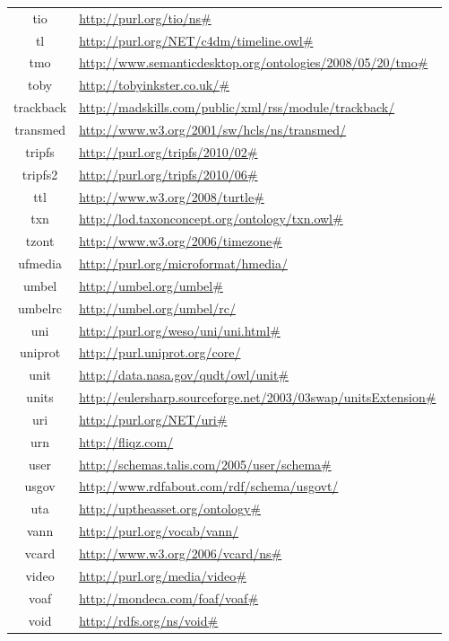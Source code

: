 \documentclass{article}
\begin{document}
\begin{longtable}{ c | p{8cm} }
		tio & \url{http://purl.org/tio/ns#} \\
		tl & \url{http://purl.org/NET/c4dm/timeline.owl#} \\
		tmo & \url{http://www.semanticdesktop.org/ontologies/2008/05/20/tmo#} \\
		toby & \url{http://tobyinkster.co.uk/#} \\
		trackback & \url{http://madskills.com/public/xml/rss/module/trackback/} \\
		transmed & \url{http://www.w3.org/2001/sw/hcls/ns/transmed/} \\
		tripfs & \url{http://purl.org/tripfs/2010/02#} \\
		tripfs2 & \url{http://purl.org/tripfs/2010/06#} \\
		ttl & \url{http://www.w3.org/2008/turtle#} \\
		txn & \url{http://lod.taxonconcept.org/ontology/txn.owl#} \\
		tzont & \url{http://www.w3.org/2006/timezone#} \\
		ufmedia & \url{http://purl.org/microformat/hmedia/} \\
		umbel & \url{http://umbel.org/umbel#} \\
		umbelrc & \url{http://umbel.org/umbel/rc/} \\
		uni & \url{http://purl.org/weso/uni/uni.html#} \\
		uniprot & \url{http://purl.uniprot.org/core/} \\
		unit & \url{http://data.nasa.gov/qudt/owl/unit#} \\
		units & \url{http://eulersharp.sourceforge.net/2003/03swap/unitsExtension#} \\
		uri & \url{http://purl.org/NET/uri#} \\
		urn & \url{http://fliqz.com/} \\
		user & \url{http://schemas.talis.com/2005/user/schema#} \\
		usgov & \url{http://www.rdfabout.com/rdf/schema/usgovt/} \\
		uta & \url{http://uptheasset.org/ontology#} \\
		vann & \url{http://purl.org/vocab/vann/} \\
		vcard & \url{http://www.w3.org/2006/vcard/ns#} \\
		video & \url{http://purl.org/media/video#} \\
		voaf & \url{http://mondeca.com/foaf/voaf#} \\
		void & \url{http://rdfs.org/ns/void#} \\

\end{longtable}
\end{document}
